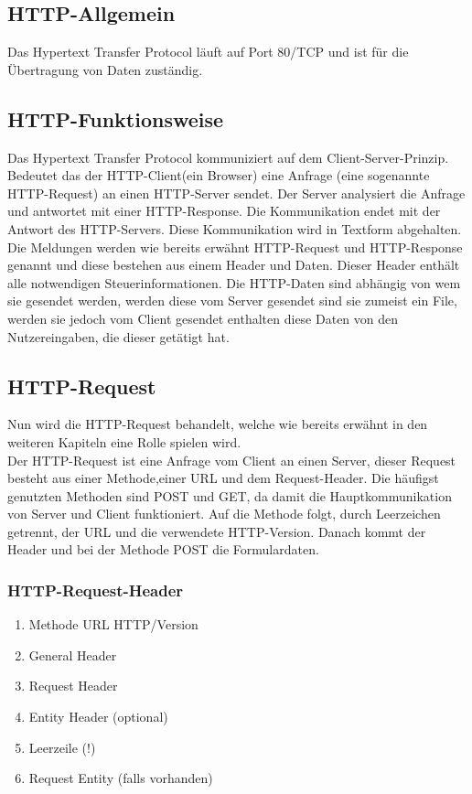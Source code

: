 \subsection{HTTP-Allgemein}
Das Hypertext Transfer Protocol läuft auf Port 80/TCP und ist für die Übertragung von Daten zuständig.
\subsection{HTTP-Funktionsweise}
Das Hypertext Transfer Protocol kommuniziert auf dem Client-Server-Prinzip. Bedeutet das der HTTP-Client(ein Browser) eine Anfrage (eine sogenannte HTTP-Request) an einen HTTP-Server sendet. Der Server analysiert die Anfrage und antwortet mit einer HTTP-Response. Die Kommunikation endet mit der Antwort des HTTP-Servers. Diese Kommunikation wird in Textform abgehalten. Die Meldungen werden wie bereits erwähnt HTTP-Request und HTTP-Response genannt und diese bestehen aus einem Header und Daten. Dieser Header enthält alle notwendigen Steuerinformationen. Die HTTP-Daten sind abhängig von wem sie gesendet werden, werden diese vom Server gesendet sind sie zumeist ein File, werden sie jedoch vom Client gesendet enthalten diese Daten von den Nutzereingaben, die dieser getätigt hat.
\subsection{HTTP-Request}
Nun wird die HTTP-Request behandelt, welche wie bereits erwähnt in den weiteren Kapiteln eine Rolle spielen wird.\\Der HTTP-Request ist eine Anfrage vom Client an einen Server, dieser Request besteht aus einer Methode,einer URL und dem Request-Header. Die häufigst genutzten Methoden sind POST und GET, da damit die Hauptkommunikation von Server und Client funktioniert. Auf die Methode folgt, durch Leerzeichen getrennt, der URL und die verwendete HTTP-Version. Danach kommt der Header und bei der Methode POST die Formulardaten.
\subsubsection{HTTP-Request-Header}
\begin{enumerate}
\item Methode URL HTTP/Version
\item General Header
\item Request Header
\item Entity Header (optional)
\item Leerzeile (!)
\item Request Entity (falls vorhanden)
\end{enumerate}
